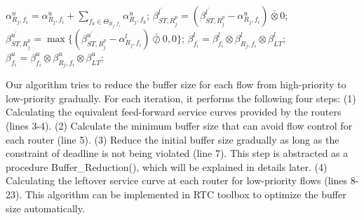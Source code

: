 \documentclass[preprint]{elsarticle}
\begin{document}
\begin{algorithm}[!h]
\begin{algorithmic}[1]
                    \State $\alpha^u_{R_j,f_i}=\alpha^u_{R_j,f_i}+\sum_{f_k\in\Theta_{R_j,f_i}}\alpha^u_{R_j,f_k}$;
                    \State $\beta^{l^\prime}_{ST,R_j^{p}}=(\beta^{l^\prime}_{ST,R_j^{p}}-\alpha^u_{R_j,f_i})\bar{\otimes}0$;
                    \State $\beta^{u^\prime}_{ST,R_j^{p}}=\max\{(\beta^{u^\prime}_{ST,R_j^{p}}-\alpha^l_{R_j,f_i})\bar{\oslash}0,0\}$;
                \EndIf
            \EndIf
            \State $\beta_{f_i}^l=\beta_{f_i}^l\otimes\beta^l_{R_j,f_i}\otimes\beta^l_{LT}$; $\beta_{f_i}^u=\beta_{f_i}^u\otimes\beta^u_{R_j,f_i}\otimes\beta^u_{LT}$;
        \EndFor
    \EndFor
\end{algorithmic}
\end{algorithm}

Our algorithm tries to reduce the buffer size for each flow from high-priority to low-priority gradually. For each iteration, it performs the following four steps: (1) Calculating the equivalent feed-forward service curves provided by the routers (lines 3-4). (2) Calculate the minimum buffer size that can avoid flow control for each router (line 5). (3) Reduce the initial buffer size gradually as long as the constraint of deadline is not being violated (line 7). This step is abstracted as a procedure Buffer\_Reduction(), which will be explained in details later. (4) Calculating the leftover service curve at each router for low-priority flows (lines 8-23). This algorithm can be implemented in RTC toolbox \cite{rtc} to optimize the buffer size automatically.
\end{document}
